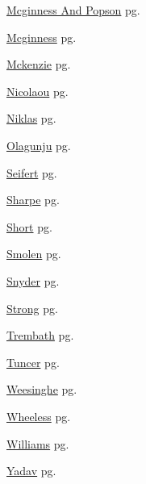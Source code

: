 \item \hyperlink{Mcginness And Popson.1}{Mcginness And Popson} pg. \pageref{abs:Mcginness And Popson}
\item \hyperlink{Mcginness.1}{Mcginness} pg. \pageref{abs:Mcginness}
\item \hyperlink{Mckenzie.1}{Mckenzie} pg. \pageref{abs:Mckenzie}
\item \hyperlink{Nicolaou.1}{Nicolaou} pg. \pageref{abs:Nicolaou}
\item \hyperlink{Niklas.1}{Niklas} pg. \pageref{abs:Niklas}
\item \hyperlink{Olagunju.1}{Olagunju} pg. \pageref{abs:Olagunju}
\item \hyperlink{Seifert.1}{Seifert} pg. \pageref{abs:Seifert}
\item \hyperlink{Sharpe.1}{Sharpe} pg. \pageref{abs:Sharpe}
\item \hyperlink{Short.1}{Short} pg. \pageref{abs:Short}
\item \hyperlink{Smolen.1}{Smolen} pg. \pageref{abs:Smolen}
\item \hyperlink{Snyder.1}{Snyder} pg. \pageref{abs:Snyder}
\item \hyperlink{Strong.1}{Strong} pg. \pageref{abs:Strong}
\item \hyperlink{Trembath.1}{Trembath} pg. \pageref{abs:Trembath}
\item \hyperlink{Tuncer.1}{Tuncer} pg. \pageref{abs:Tuncer}
\item \hyperlink{Weesinghe.1}{Weesinghe} pg. \pageref{abs:Weesinghe}
\item \hyperlink{Wheeless.1}{Wheeless} pg. \pageref{abs:Wheeless}
\item \hyperlink{Williams.1}{Williams} pg. \pageref{abs:Williams}
\item \hyperlink{Yadav.1}{Yadav} pg. \pageref{abs:Yadav}
